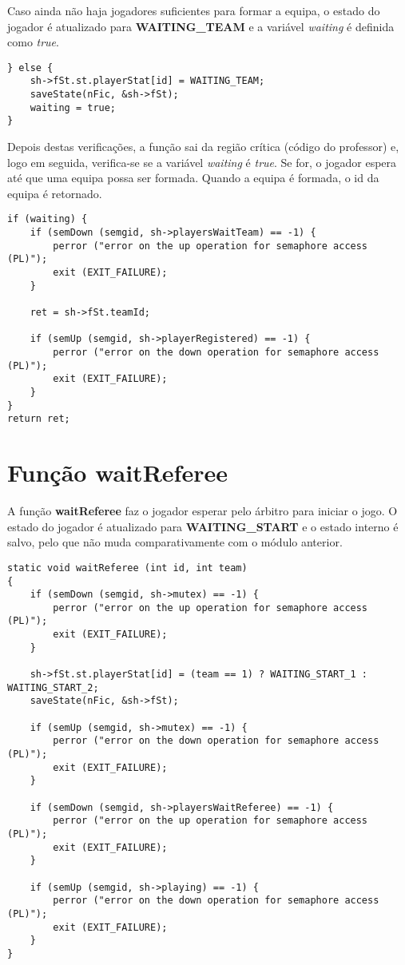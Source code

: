 \documentclass[code,math]{relatorio-deti}
\begin{document}
Caso ainda não haja jogadores suficientes para formar a equipa, o estado do jogador é atualizado para \textbf{WAITING\_TEAM} e a variável \textit{waiting} é definida como \textit{true}.

\begin{verbatim}
} else {
    sh->fSt.st.playerStat[id] = WAITING_TEAM;
    saveState(nFic, &sh->fSt);
    waiting = true;
}
\end{verbatim}

Depois destas verificações, a função sai da região crítica (código do professor) e, logo em seguida, verifica-se se a variável \textit{waiting} é \textit{true}. Se for, o jogador espera até que uma equipa possa ser formada. Quando a equipa é formada, o id da equipa é retornado.

\begin{verbatim}
if (waiting) {
    if (semDown (semgid, sh->playersWaitTeam) == -1) {                                                     
        perror ("error on the up operation for semaphore access (PL)");
        exit (EXIT_FAILURE);
    }

    ret = sh->fSt.teamId;

    if (semUp (semgid, sh->playerRegistered) == -1) {                                                         
        perror ("error on the down operation for semaphore access (PL)");
        exit (EXIT_FAILURE);
    }
}
return ret;
\end{verbatim}

\section{Função \textbf{waitReferee}}

A função \textbf{waitReferee} faz o jogador esperar pelo árbitro para iniciar o jogo. O estado do jogador é atualizado para \textbf{WAITING\_START} e o estado interno é salvo, pelo que não muda comparativamente com o módulo anterior.

\begin{verbatim}
static void waitReferee (int id, int team)
{
    if (semDown (semgid, sh->mutex) == -1) {                                                     
        perror ("error on the up operation for semaphore access (PL)");
        exit (EXIT_FAILURE);
    }

    sh->fSt.st.playerStat[id] = (team == 1) ? WAITING_START_1 : WAITING_START_2;
    saveState(nFic, &sh->fSt);

    if (semUp (semgid, sh->mutex) == -1) {                                                         
        perror ("error on the down operation for semaphore access (PL)");
        exit (EXIT_FAILURE);
    }

    if (semDown (semgid, sh->playersWaitReferee) == -1) {                                                     
        perror ("error on the up operation for semaphore access (PL)");
        exit (EXIT_FAILURE);
    }

    if (semUp (semgid, sh->playing) == -1) {                                                         
        perror ("error on the down operation for semaphore access (PL)");
        exit (EXIT_FAILURE);
    }
}
\end{verbatim}
\end{document}

